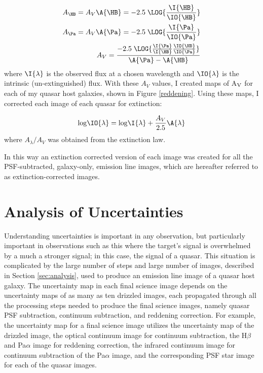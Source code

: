 \begin{eqnarray}
\label{eq:Av}
A_{\HB} = A_V\A{\HB} = -2.5\;\LOG{\frac{\I{\HB}}{\IO{\HB}}}\\
A_{\Pa} = A_V\A{\Pa} = -2.5\;\LOG{\frac{\I{\Pa}}{\IO{\Pa}}}\\
A_V = \frac{-2.5\;\LOG{\frac{\I{\Pa}}{\I{\HB}}\frac{\IO{\HB}}{\IO{\Pa}}}}{\A{\Pa}-\A{\HB}}
\end{eqnarray}
where $\I{\lambda}$ is the observed flux at a chosen wavelength and $\IO{\lambda}$ is the intrinsic (un-extinguished) flux. With these $A_V$ values, I created maps of A$_{\rm V}$ for each of my quasar host galaxies, shown in Figure \ref{reddening}.  Using these maps, I corrected each image of each quasar for extinction:

\begin{equation}
\label{eq:extinction}
{\rm log}\IO{\lambda} = {\rm log}\I{\lambda} + \frac{A_V}{2.5}\A{\lambda}
\end{equation}
where $A_\lambda/A_V$ was obtained from the \cite{CCM} extinction law.

In this way an extinction corrected version of each image was created for all the PSF-subtracted, galaxy-only, emission line images, which are hereafter referred to as extinction-corrected images.



\section{Analysis of Uncertainties}
\label{sec:uncertainties}

Understanding uncertainties is important in any observation, but particularly important in observations such as this where the target's signal is overwhelmed by a much a stronger signal; in this case, the signal of a quasar.  This situation is complicated by the large number of steps and large  number of images, described in Section \ref{sec:analysis}, used to produce an emission line image of a quasar host galaxy. The uncertainty map in each final science image depends on the uncertainty maps of as many as ten drizzled images, each propagated through all the processing steps needed to produce the final science images, namely  quasar PSF subtraction, continuum subtraction, and reddening correction.  For example, the uncertainty map for a final  science image utilizes the uncertainty map of the drizzled  image, the optical continuum image for continuum subtraction, the H$\beta$ and Pa$\alpha$ image for reddening correction, the infrared continuum image for continuum subtraction of the Pa$\alpha$ image, and the corresponding PSF star image for each of the quasar images.

